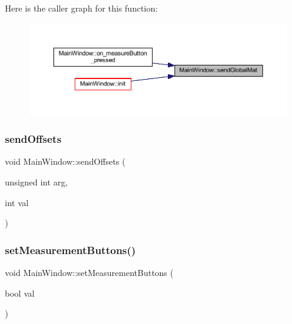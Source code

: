 Here is the caller graph for this function\+:
\nopagebreak
\begin{figure}[H]
\begin{center}
\leavevmode
\includegraphics[width=350pt]{class_main_window_a302481f26ce2f1666e4a4dfaddacb08e_icgraph}
\end{center}
\end{figure}
\mbox{\label{class_main_window_ab46a8e562fc57b9581b90328e0872a67}} 
\subsubsection{\texorpdfstring{sendOffsets}{sendOffsets}}
{\footnotesize\ttfamily void Main\+Window\+::send\+Offsets (\begin{DoxyParamCaption}\item[{unsigned int}]{arg,  }\item[{int}]{val }\end{DoxyParamCaption})\hspace{0.3cm}{\ttfamily [signal]}}

\mbox{\label{class_main_window_aa6af159870a097c8347efae3a7c26e6f}} 
\subsubsection{\texorpdfstring{setMeasurementButtons()}{setMeasurementButtons()}}
{\footnotesize\ttfamily void Main\+Window\+::set\+Measurement\+Buttons (\begin{DoxyParamCaption}\item[{bool}]{val }\end{DoxyParamCaption})\hspace{0.3cm}{\ttfamily [private]}}



